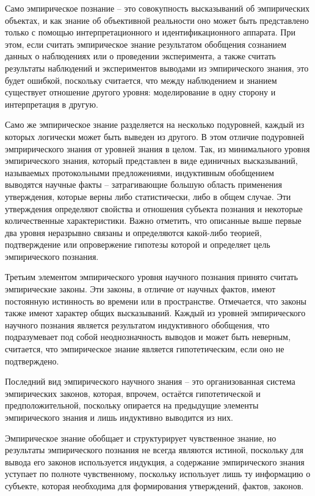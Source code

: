 \documentclass[14pt]{article}
\begin{document}
Само эмпирическое познание -- это совокупность высказываний об эмпирических объектах, и как знание об объективной реальности оно может быть представлено только с помощью интерпретационного и идентификационного аппарата.  При этом, если считать эмпирическое знание результатом обобщения сознанием данных о наблюдениях или о проведении эксперимента, а также считать результаты наблюдений и экспериментов выводами из эмпирического знания, это будет ошибкой, поскольку считается, что между наблюдением и знанием существует отношение другого уровня: моделирование в одну сторону и интерпретация в другую.

Само же эмпирическое знание разделяется на несколько подуровней, каждый из которых логически может быть выведен из другого. В этом отличие подуровней эмприрического знания от уровней знания в целом. Так, из минимального уровня эмпирического знания, который представлен в виде единичных высказываний, называемых протокольными предложениями, индуктивным обобщением выводятся научные факты -- затрагивающие большую область применения утверждения, которые верны либо статистически, либо в общем случае. Эти утверждения определяют свойства и отношения субъекта познания и некоторые количественные характеристики. Важно отметить, что описанные выше первые два уровня неразрывно связаны и определяются какой-либо теорией, подтверждение или опровержение гипотезы которой и определяет цель эмпирического познания. 

Третьим элементом эмпирического уровня научного познания принято считать эмпирические законы. Эти законы, в отличие от научных фактов, имеют постоянную истинность во времени или в пространстве. Отмечается, что законы также имеют характер общих высказываний. Каждый из уровней эмпирического научного познания является результатом индуктивного обобщения, что подразумевает под собой неоднозначность выводов и может быть неверным, считается, что эмпирическое знание является гипотетическим, если оно не подтверждено.

Последний вид эмпирического научного знания -- это организованная система эмпирических законов, которая, впрочем, остаётся гипотетической и предположительной, поскольку опирается на предыдущие элементы эмпирического знания и лишь индуктивно выводится из них. 

Эмпирическое знание обобщает и структурирует чувственное знание, но результаты эмпирического познания не всегда являются истиной, поскольку для вывода его законов используется индукция, а содержание эмпирического знания уступает по полноте чувственному, поскольку использует лишь ту информацию о субъекте, которая необходима для формирования утверждений, фактов, законов.
\end{document}
